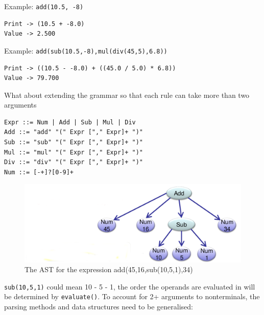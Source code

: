 \documentclass[
]{book}
\begin{document}
Example: \texttt{add(10.5,\ -8)}

\begin{verbatim}
Print -> (10.5 + -8.0)
Value -> 2.500
\end{verbatim}

Example: \texttt{add(sub(10.5,-8),mul(div(45,5),6.8))}

\begin{verbatim}
Print -> ((10.5 - -8.0) + ((45.0 / 5.0) * 6.8))
Value -> 79.700
\end{verbatim}

What about extending the grammar so that each rule can take more than two arguments

\begin{verbatim}
Expr ::= Num | Add | Sub | Mul | Div
Add ::= "add" "(" Expr ["," Expr]+ ")"
Sub ::= "sub" "(" Expr ["," Expr]+ ")"
Mul ::= "mul" "(" Expr ["," Expr]+ ")"
Div ::= "div" "(" Expr ["," Expr]+ ")"
Num ::= [-+]?[0-9]+
\end{verbatim}

\begin{figure}
\centering
\includegraphics{img/09-image10.png}
\caption{\label{fig:example-ast-expr2}The AST for the expression add(45,16,sub(10,5,1),34)}
\end{figure}

\texttt{sub(10,5,1)} could mean 10 - 5 - 1, the order the operands are evaluated in will be determined by \texttt{evaluate()}. To account for 2+ arguments to nonterminals, the parsing methods and data structures need to be generalised:
\end{document}
